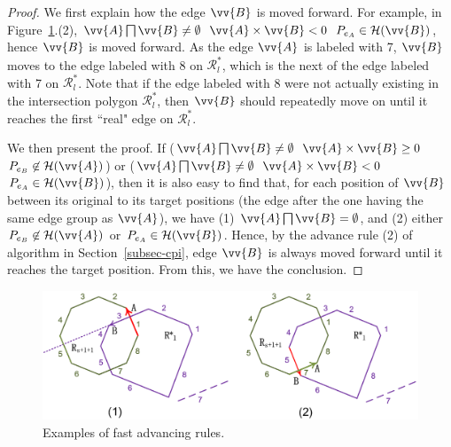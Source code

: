 \begin{proof}
We first explain how the edge $\vv{B}$ is moved forward.
For example, in Figure~\ref{fig:r-poly-rule1}.(2), $\vv{A} \bigsqcap \vv{B} \ne \emptyset$ \And $\vv{A} \times \vv{B} < 0$ \And $P_{e_A} \in \mathcal{H}(\vv{B})$, hence $\vv{B}$ is moved forward. As the edge $\vv{A}$ is labeled with 7,
$\vv{B}$ moves to the edge labeled with 8 on $\mathcal{R}^*_{l}$, which is the next of the edge labeled with 7 on $\mathcal{R}^*_{l}$.
Note that if the edge labeled with 8 were not actually existing in the intersection polygon $\mathcal{R}^*_{l}$, then $\vv{B}$ should repeatedly move on until it reaches the first ``real" edge on $\mathcal{R}^*_{l}$.

We then present the proof.
If ($\vv{A} \bigsqcap \vv{B} \ne \emptyset$ \And $\vv{A} \times \vv{B} \ge 0$ \And $P_{e_B} \not \in \mathcal{H}(\vv{A})$) or ($\vv{A} \bigsqcap \vv{B} \ne \emptyset$ \And $\vv{A} \times \vv{B} < 0$ \And $P_{e_A} \in \mathcal{H}(\vv{B})$), then it is also easy to find that, for each position of $\vv{B}$ between its original to its target positions (\ie the edge after the one having the same edge group as $\vv{A}$), we have (1) $\vv{A} \bigsqcap \vv{B} = \emptyset$, and (2) either $P_{e_B} \not \in \mathcal{H}(\vv{A})$ or $P_{e_A} \in \mathcal{H}(\vv{B})$. Hence, by the advance rule (2) of algorithm \cpia in Section~\ref{subsec-cpi}, edge $\vv{B}$ is always moved forward until it reaches the target position. From this, we have the conclusion.
\end{proof}



\begin{figure}[tb!]
	\centering
	\vspace{1ex}
	\includegraphics[scale=0.82]{figures/Fig-r-poly-rule1.png}
	\vspace{-1.5ex}
	\caption{\small Examples of fast advancing rules.}
	\vspace{-2ex}
	\label{fig:r-poly-rule1}
\end{figure}


